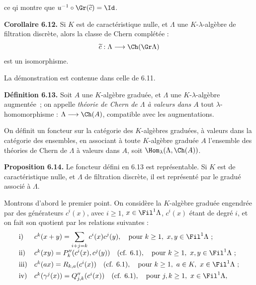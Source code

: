ce q\hphantom{u}i
montre que \(u^{-1}\circ\Gr(\widetilde c)=\Id\).

\textbf{Corollaire 6.12.} Si \(K\) est de caractéristique nulle, et \(\Lambda\) une \(K\)-\(\lambda\)-algèbre de filtration discrète, alors la classe de Chern complétée :
\[
  \widetilde c:\Lambda\longrightarrow \Ch(\Gr\Lambda)
\]
est un isomorphisme.

La démonstration est contenue dans celle de 6.11.

\textbf{Définition 6.13.} Soit \(A\) une \(K\)-algèbre graduée, et \(\Lambda\) une \(K\)-\(\lambda\)-algèbre augmentée~; on appelle \emph{théorie de Chern de \(\Lambda\) à valeurs dans \(A\)} tout \(\lambda\)-homomorphisme : \(\Lambda\longrightarrow \Ch(A)\), compatible avec les augmentations.

On définit un foncteur sur la catégorie des \(K\)-algèbres graduées, à valeurs dans la catégorie des ensembles, en associant à toute \(K\)-algèbre graduée \(A\) l'ensemble des théories de Chern de \(\Lambda\) à valeurs dans \(A\), soit \(\Hom_\lambda(\Lambda,\Ch(A))\).

\textbf{Proposition 6.14.} Le foncteur défini en 6.13 est représentable. Si \(K\) est de caractéristique nulle, et \(\Lambda\) de filtration discrète, il est représenté par le gradué associé à \(\Lambda\).

Montrons d'abord le premier point. On considère la \(K\)-algèbre graduée engendrée par des générateurs \(c^i(x)\), avec \(i\ge1\), \(x\in\Fil^1\Lambda\), \(c^i(x)\) étant de degré \(i\), et on fait son quotient par les relations suivantes :
\[
\begin{array}{ll}
\text{i)}&
 c^k(x+y)=\displaystyle\sum_{i+j=k}c^i(x)c^j(y),
 \quad\text{pour } k\ge1,\ x,y\in\Fil^1\Lambda\ ;\\[0.8em]
\text{ii)}&
 c^k(xy)=P''_k(c^i(x),c^j(y))
 \quad(\text{cf. }6.1),
 \quad\text{pour } k\ge1,\ x,y\in\Fil^1\Lambda\ ;\\[0.4em]
\text{iii)}&
 c^k(ax)=R_{k,a}(c^i(x)) \quad(\text{cf. }6.1),
 \quad\text{pour } k\ge1,\ a\in K,\ x\in\Fil^1\Lambda\ ;\\[0.4em]
\text{iv)}&
 c^k(\gamma^j(x))=Q''_{j,k}(c^i(x))
 \quad(\text{cf. }6.1),
 \quad\text{pour } j,k\ge1,\ x\in\Fil^1\Lambda,
\end{array}
\]
